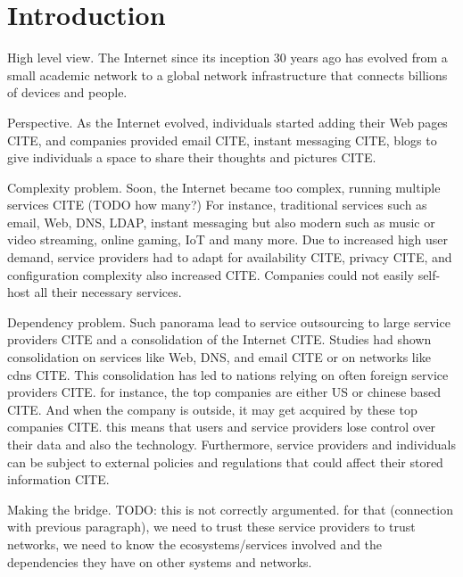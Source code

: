 \chapter{Introduction}
\label{sec:introduction}

High level view. The Internet since its inception 30 years ago has evolved from a small academic network to a global network infrastructure that connects billions of devices and people.

Perspective. As the Internet evolved, individuals started adding their Web pages CITE, and companies provided email CITE, instant messaging CITE, blogs to give individuals a space to share their thoughts and pictures CITE.

Complexity problem. Soon, the Internet became too complex, running multiple services CITE (TODO how many?)
For instance, traditional services such as email, Web, DNS, LDAP, instant messaging but also modern such as music or video streaming, online gaming, IoT and many more.
Due to increased high user demand, service providers had to adapt for availability CITE, privacy CITE, and configuration complexity also increased CITE.
Companies could not easily self-host all their necessary services.

Dependency problem. Such panorama lead to service outsourcing to large service providers CITE and a consolidation of the Internet CITE.
Studies had shown consolidation on services like Web, DNS, and email CITE or on networks like \glspl{cdn} CITE.
This consolidation has led to nations relying on often foreign service providers CITE.
for instance, the top companies are either US or chinese based CITE.
And when the company is outside, it may get acquired by these top companies CITE.
this means that users and service providers lose control over their data and also the technology.
Furthermore, service providers and individuals can be subject to external policies and regulations that could affect their stored information CITE.

Making the bridge.
TODO: this is not correctly argumented.
for that (connection with previous paragraph), we need to trust these service providers
to trust networks, we need to know the ecosystems/services involved and the dependencies they have on other systems and networks.


